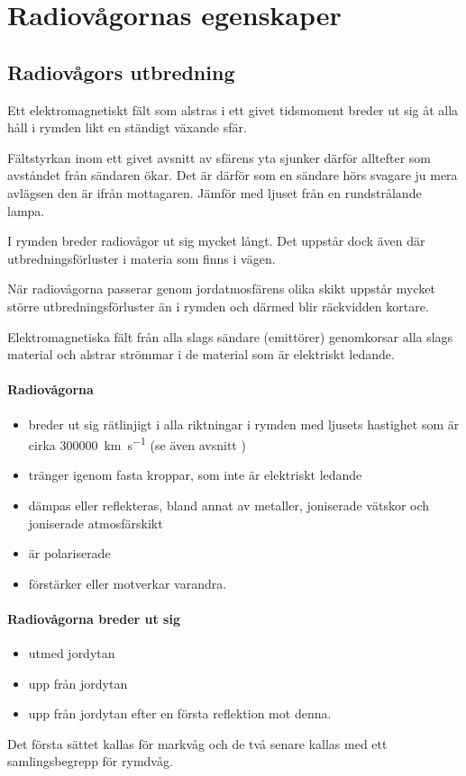 \section{Radiovågornas egenskaper}
\label{radiovågornasegenskaper}

\subsection{Radiovågors utbredning}

Ett elektromagnetiskt fält som alstras i ett givet tidsmoment breder
ut sig åt alla håll i rymden likt en ständigt växande sfär.

Fältstyrkan inom ett givet avsnitt av sfärens yta sjunker därför alltefter som
avståndet från sändaren ökar.
Det är därför som en sändare hörs svagare ju mera avlägsen den är ifrån
mottagaren.
Jämför med ljuset från en rundstrålande lampa.

I rymden breder radiovågor ut sig mycket långt. Det uppstår dock även
där utbredningsförluster i materia som finns i vägen.

När radiovågorna passerar genom jordatmosfärens olika skikt uppstår mycket
större utbredningsförluster än i rymden och därmed blir räckvidden kortare.

Elektromagnetiska fält från alla slags sändare (emittörer) genomkorsar alla
slags material och alstrar strömmar i de material som är elektriskt ledande.

\paragraph{Radiovågorna}
\begin{itemize}
  \item breder ut sig rätlinjigt i alla riktningar i rymden med ljusets
  hastighet som är cirka \SI{300000}{\kilo\metre\per\second} (se även avsnitt
  )
  \item tränger igenom fasta kroppar, som inte är elektriskt ledande
  \item dämpas eller reflekteras, bland annat av metaller, joniserade vätskor
  och joniserade atmosfärskikt
  \item är polariserade
  \item förstärker eller motverkar varandra.
\end{itemize}

\paragraph{Radiovågorna breder ut sig}
\begin{itemize}
  \item utmed jordytan
  \item upp från jordytan
  \item upp från jordytan efter en första reflektion mot denna.
\end{itemize}
Det första sättet kallas för markvåg och de två senare kallas med ett
samlingsbegrepp för rymdvåg.

